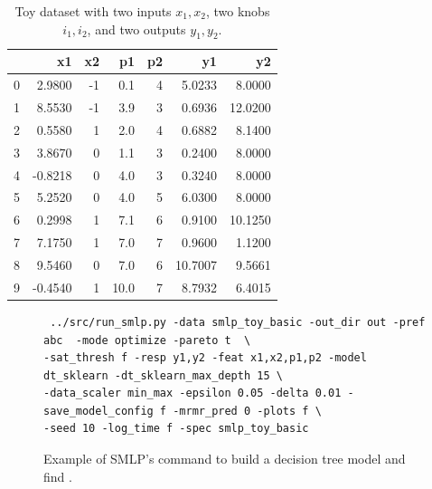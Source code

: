\documentclass[a4paper,parskip=half]{article} %
\begin{document}
\begin{table}[t]
\centering\small
\begin{tabular}{lrrrrrr}
\hline %
{} &      x1 &  x2 &    p1 &  p2 &       y1 &       y2 \\
\hline %
0 &  2.9800 &  -1 &   0.1 &   4 &   5.0233 &   8.0000 \\
1 &  8.5530 &  -1 &   3.9 &   3 &   0.6936 &  12.0200 \\
2 &  0.5580 &   1 &   2.0 &   4 &   0.6882 &   8.1400 \\
3 &  3.8670 &   0 &   1.1 &   3 &   0.2400 &   8.0000 \\
4 & -0.8218 &   0 &   4.0 &   3 &   0.3240 &   8.0000 \\
5 &  5.2520 &   0 &   4.0 &   5 &   6.0300 &   8.0000 \\
6 &  0.2998 &   1 &   7.1 &   6 &   0.9100 &  10.1250 \\
7 &  7.1750 &   1 &   7.0 &   7 &   0.9600 &   1.1200 \\
8 &  9.5460 &   0 &   7.0 &   6 &  10.7007 &   9.5661 \\
9 & -0.4540 &   1 &  10.0 &   7 &   8.7932 &   6.4015 \\
\hline %
\end{tabular}
\caption{Toy dataset with two inputs $x_1, x_2$, two knobs $i_1, i_2$, and two outputs $y_1, y_2$.}
\label{toy_basic_df}
\end{table}

\begin{figure}%
\begin{verbatim}
 ../src/run_smlp.py -data smlp_toy_basic -out_dir out -pref abc  -mode optimize -pareto t  \
-sat_thresh f -resp y1,y2 -feat x1,x2,p1,p2 -model dt_sklearn -dt_sklearn_max_depth 15 \
-data_scaler min_max -epsilon 0.05 -delta 0.01 -save_model_config f -mrmr_pred 0 -plots f \
-seed 10 -log_time f -spec smlp_toy_basic
\end{verbatim}
\caption{Example of SMLP's command to build a decision tree model and find .}
\label{fig:command}
\end{figure}
\end{document}
